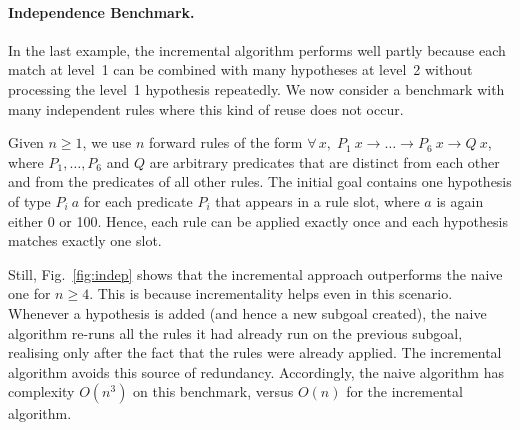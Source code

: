 \documentclass[runningheads,leqno]{llncs}
\newcommand{\All}[2]{\ensuremath{\forall\, #1,\; #2}}
\begin{document}
\paragraph{Independence Benchmark.}
In the last example, the incremental algorithm performs well partly because each match at level~1 can be combined with many hypotheses at level~2 without processing the level~1 hypothesis repeatedly.
We now consider a benchmark with many independent rules where this kind of reuse does not occur.

Given $n ≥ 1$, we use $n$ forward rules of the form $\All{x}{P_{1}~x → \dots → P_{6}~x → Q~x}$, where $P_{1}, \dots, P_{6}$ and $Q$ are arbitrary predicates that are distinct from each other and from the predicates of all other rules.
The initial goal contains one hypothesis of type $P_{i}~a$ for each predicate $P_{i}$ that appears in a rule slot, where $a$ is again either 0 or 100.
Hence, each rule can be applied exactly once and each hypothesis matches exactly one slot.

Still, Fig.~\ref{fig:indep} shows that the incremental approach outperforms the naive one for $n ≥ 4$.
This is because incrementality helps even in this scenario.
Whenever a hypothesis is added (and hence a new subgoal created), the naive algorithm re-runs all the rules it had already run on the previous subgoal, realising only after the fact that the rules were already applied.
The incremental algorithm avoids this source of redundancy.
Accordingly, the naive algorithm has complexity $O(n^{3})$ on this benchmark, versus $O(n)$ for the incremental algorithm.
\end{document}
